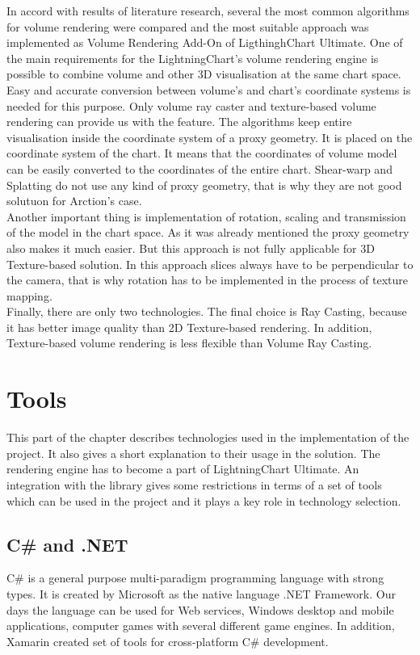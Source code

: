 \documentclass[twoside, english, 11pt]{report}
\begin{document}
In accord with results of literature research, several the most common algorithms for volume rendering were compared and the most suitable approach was implemented as Volume Rendering Add-On of LigthinghChart Ultimate. One of the main requirements for the LightningChart's volume rendering engine is possible to combine volume and other 3D visualisation at the same chart space. Easy and accurate conversion between volume's and chart's coordinate systems is needed for this  purpose. Only volume ray caster and texture-based volume rendering can provide us with the feature. The algorithms keep entire visualisation inside the coordinate system of a proxy geometry. It is placed on the coordinate system of the chart. It means that the coordinates of volume model can be easily converted to the coordinates of the entire chart. Shear-warp and Splatting do not use any kind of proxy geometry, that is why they are not good solutuon for Arction's case.\\

Another important thing is implementation of rotation, scaling and transmission of the model in the chart space. As it was already mentioned the proxy geometry also makes it much easier. But this approach is not fully applicable for 3D Texture-based solution. In this approach slices always have to be perpendicular to the camera, that is why rotation has to be implemented in the process of texture mapping.\\

Finally, there are only two technologies. The final choice is Ray Casting, because it has better image quality than 2D Texture-based rendering. In addition, Texture-based volume rendering is less flexible than Volume Ray Casting.
\section{Tools}
This part of the chapter describes technologies used in the implementation of the project. It also gives a short explanation to their usage in the solution. The rendering engine has to become a part of LightningChart Ultimate. An integration with the library gives some restrictions in terms of a set of tools which can be used in the project and it plays a key role in technology selection.
\subsection{C\# and .NET}
C\# is a general purpose multi-paradigm programming language with strong types. It is created by Microsoft as the native language .NET Framework. Our days the language can be used for Web services, Windows desktop and mobile applications, computer games with several different game engines. In addition, Xamarin created set of tools for cross-platform C\# development.\\
\end{document}
